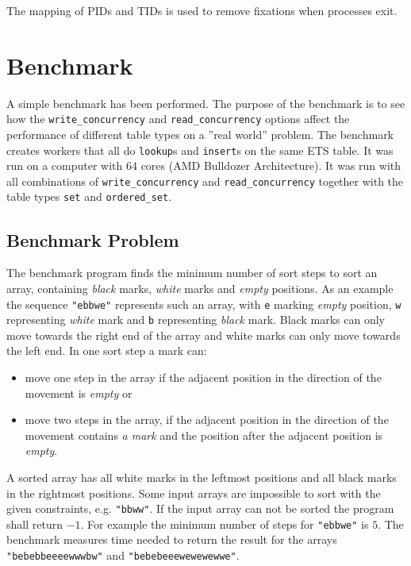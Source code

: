 \documentclass[aps,pre,preprint,nofootinbib]{revtex4}
\begin{document}
The mapping of PIDs and TIDs is used to remove fixations when processes exit.

\section{Benchmark} \label{sec:benchmark}

A simple benchmark has been performed.
The purpose of the benchmark is to see how the \verb|write_concurrency| and \verb|read_concurrency| options affect the performance of different table types on a ''real world'' problem.
The benchmark creates workers that all do \verb|lookup|s and \verb|insert|s on the same ETS table.
It was run on a computer with 64 cores (AMD Bulldozer Architecture).
It was run with all combinations of \verb|write_concurrency| and \verb|read_concurrency| together with the table types \verb|set| and \verb|ordered_set|.

\subsection{Benchmark Problem}
The benchmark program finds the minimum number of sort steps to sort an array, containing \emph{black} marks, \emph{white} marks and \emph{empty} positions.
As an example the sequence \verb|"ebbwe"| represents such an array, with \verb|e| marking \emph{empty} position, \verb|w| representing \emph{white} mark and \verb|b| representing \emph{black} mark.
Black marks can only move towards the right end of the array and white marks can only move towards the left end.
In one sort step a mark can:
\begin{itemize}
\item move one step in the array if the adjacent position in the direction of the movement is \emph{empty} or
\item move two steps in the array, if the adjacent position in the direction of the movement contains \emph{a mark} and the position after the adjacent position is \emph{empty}.
\end{itemize}
A sorted array has all white marks in the leftmost positions and all black marks in the rightmost positions.
Some input arrays are impossible to sort with the given constraints, e.g. \verb|"bbww"|.
If the input array can not be sorted the program shall return $-1$.
For example the minimum number of steps for \verb|"ebbwe"| is $5$.
The benchmark measures time needed to return the result for the arrays \verb|"bebebbeeeewwwbw"| and \verb|"bebebeeewewewewwe"|.
\end{document}
